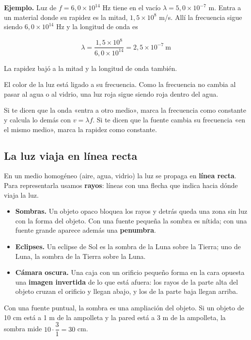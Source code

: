 \textbf{Ejemplo.} Luz de $f = 6{,}0\times10^{14}$ Hz tiene en el vacío $\lambda = 5{,}0\times10^{-7}$ m. Entra a un material donde su rapidez es la mitad, $1{,}5\times10^{8}$ m/s. Allí la frecuencia sigue siendo $6{,}0\times10^{14}$ Hz y la longitud de onda es

 \[ \lambda = \dfrac{1{,}5\times10^{8}}{6{,}0\times10^{14}} = 2{,}5\times10^{-7}\ \text{m} \] 

La rapidez bajó a la mitad y la longitud de onda también.

  
\begin{clave}[{Recuerda}] El color de la luz está ligado a su frecuencia. Como la frecuencia no cambia al pasar al agua o al vidrio, una luz roja sigue siendo roja dentro del agua.\end{clave}
 
\begin{clave} Si te dicen que la onda «entra a otro medio», marca la frecuencia como constante y calcula lo demás con $v = \lambda f$. Si te dicen que la fuente cambia su frecuencia «en el mismo medio», marca la rapidez como constante.\end{clave}
\subsection{La luz viaja en línea recta}
En un medio homogéneo (aire, agua, vidrio) la luz se propaga en \textbf{línea recta}. Para representarla usamos \textbf{rayos}: líneas con una flecha que indica hacia dónde viaja la luz.

 
\begin{itemize}
  \item \textbf{Sombras.} Un objeto opaco bloquea los rayos y detrás queda una zona sin luz con la forma del objeto. Con una fuente pequeña la sombra es nítida; con una fuente grande aparece además una \textbf{penumbra}.
  \item \textbf{Eclipses.} Un eclipse de Sol es la sombra de la Luna sobre la Tierra; uno de Luna, la sombra de la Tierra sobre la Luna.
  \item \textbf{Cámara oscura.} Una caja con un orificio pequeño forma en la cara opuesta una \textbf{imagen invertida} de lo que está afuera: los rayos de la parte alta del objeto cruzan el orificio y llegan abajo, y los de la parte baja llegan arriba.
\end{itemize}
  
\begin{clave} Con una fuente puntual, la sombra es una ampliación del objeto. Si un objeto de 10 cm está a 1 m de la ampolleta y la pared está a 3 m de la ampolleta, la sombra mide $10 \cdot \dfrac{3}{1} = 30$ cm.\end{clave}
 
